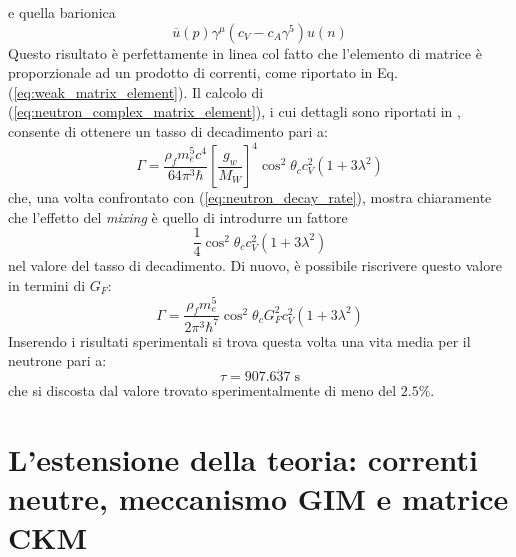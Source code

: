 \documentclass{subnucbo}
\begin{document}
e quella barionica
\begin{equation}
        \overline { u } ( p ) \gamma ^ { \mu } \left( c _ { V } - c _ { A } \gamma ^ { 5 } \right) u ( n )
        \label{eq:barionic_current}
\end{equation}
Questo risultato è perfettamente in linea col fatto che l'elemento di matrice è proporzionale ad un prodotto di correnti, come riportato in Eq. (\ref{eq:weak_matrix_element}).
Il calcolo di (\ref{eq:neutron_complex_matrix_element}), i cui dettagli sono riportati in \cite{ref:hayes}, consente di ottenere un tasso di decadimento pari a:
\begin{equation}
        \Gamma = \frac { \rho_{f} m _ { e } ^ { 5 } c ^ { 4 } } { 64 \pi ^ { 3 } \hbar } \left[ \frac { g _ { w } } { M _ { W } } \right] ^ { 4 } \cos^{2}\theta_{c} c _ { V } ^ { 2 } \left( 1 + 3 \lambda ^ { 2 } \right)
\end{equation}
che, una volta confrontato con (\ref{eq:neutron_decay_rate}), mostra chiaramente che l'effetto del \textit{mixing} è quello di introdurre un fattore
\begin{equation}
        \frac { 1 } { 4 } \cos^{2}\theta_{c} c _ { V } ^ { 2 } \left( 1 + 3 \lambda ^ { 2 } \right)
\end{equation}
nel valore del tasso di decadimento. Di nuovo, è possibile riscrivere questo valore in termini di $G_{F}$:
\begin{equation}
        \Gamma = \frac { \rho_{f} m _ { e } ^ { 5 } } { 2 \pi ^ { 3 } \hbar ^ { 7 } } \cos^{2}\theta_{c} G _ { F } ^ { 2 } c_{V}^{2} \left( 1 + 3 \lambda ^ { 2 } \right)
\end{equation}
Inserendo i risultati sperimentali si trova questa volta una vita media per il neutrone pari a:
\begin{equation}
        \tau = 907.637\; \mathrm{s}
\end{equation}
che si discosta dal valore trovato sperimentalmente di meno del $2.5\%$.

\section{L'estensione della teoria: correnti neutre, meccanismo GIM e matrice CKM}
\end{document}
